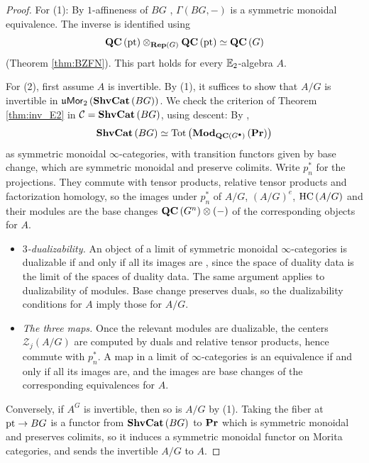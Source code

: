 \begin{proof}
For (1): By $1$-affineness of $BG$ \cite[Theorem 2.2.2]{G:ShvCat},
$\Gamma\left(BG,-\right)$ is a symmetric monoidal equivalence.
The inverse is identified using
\begin{equation*}
\mathbf{QC}\left(\text{pt}\right)\otimes_{\mathbf{Rep}\left(G\right)}\mathbf{QC}\left(\text{pt}\right)\simeq\mathbf{QC}\left(G\right)
\end{equation*}
(Theorem \ref{thm:BZFN}).
This part holds for every $\mathbb{E}_2$-algebra $A$.

For (2), first assume $A$ is invertible.
By (1), it suffices to show that $A/G$ is invertible in
$\mathfrak{u}\mathsf{Mor}_2\left(\mathbf{ShvCat}\left(BG\right)\right)$.
We check the criterion of Theorem \ref{thm:inv_E2} in
$\mathcal{C} = \mathbf{ShvCat}\left(BG\right)$, using descent: By \cite[Theorem 1.5.7]{G:ShvCat},
\begin{equation*}
\mathbf{ShvCat}\left(BG\right)\simeq\mathrm{Tot}\left(\mathbf{Mod}_{\mathbf{QC}\left(G^\bullet\right)}\left(\mathbf{Pr}\right)\right)
\end{equation*}
as symmetric monoidal $\infty$-categories, with transition functors given by base change,
which are symmetric monoidal and preserve colimits. Write $p_n^*$ for the projections. They
commute with tensor products, relative tensor products and factorization homology, so the
images under $p_n^*$ of $A/G$, $\left(A/G\right)^e$, $\operatorname{HC}\left(A/G\right)$ and their modules
are the base changes $\mathbf{QC}\left(G^n\right)\otimes\left(-\right)$ of the corresponding objects for
$A$.
\begin{itemize}
\item \emph{$3$-dualizability.} An object of a limit of symmetric monoidal $\infty$-categories
is dualizable if and only if all its images are \cite[Lemma 1.4.6]{G:ShvCat}, since the space of
duality data is the limit of the spaces of duality data. The same argument applies to
dualizability of modules. Base change preserves duals, so the dualizability conditions for
$A$ imply those for $A/G$.
\item \emph{The three maps.} Once the relevant modules are dualizable, the centers
$\mathcal{Z}_j\left(A/G\right)$ are computed by duals and relative tensor products, hence commute with
$p_n^*$. A map in a limit of $\infty$-categories is an equivalence if and only if all its images
are, and the images are base changes of the corresponding equivalences for $A$.
\end{itemize}
Conversely, if $A^G$ is invertible, then so is $A/G$ by (1). Taking the fiber at
$\text{pt}\to BG$ is a functor from $\mathbf{ShvCat}\left(BG\right)$ to $\mathbf{Pr}$ which is symmetric monoidal and preserves colimits, so it
induces a symmetric monoidal functor on Morita categories, and sends the invertible $A/G$ to $A$.
\end{proof}

